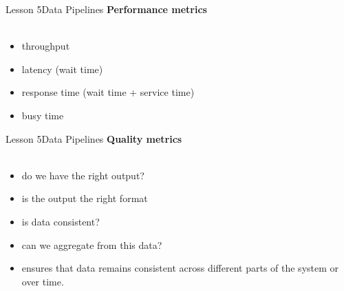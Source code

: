 \documentclass[aspectratio=1610]{beamer}
\begin{document}
\begin{frame}{Lesson 5}{Data Pipelines}
\LARGE
\textbf{Performance metrics}\\~\\
\begin{itemize}
    \item throughput
    \item latency (wait time)
    \item response time (wait time + service time)
    \item busy time
\end{itemize}
\end{frame}



\begin{frame}{Lesson 5}{Data Pipelines}
\LARGE
\textbf{Quality metrics}\\~\\
\begin{itemize}
    \item do we have the right output?
    \item is the output the right format
    \item is data consistent? 
    \item can we aggregate from this data?
    \item ensures that data remains consistent across different parts of the system or over time.
\end{itemize}
\end{frame}
\end{document}
